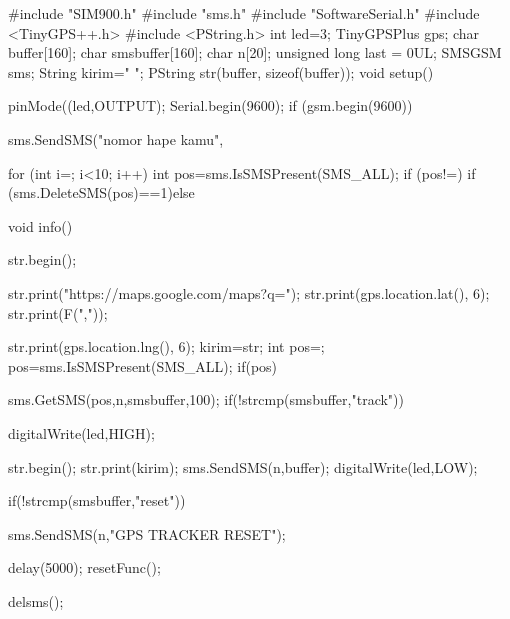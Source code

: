 #include "SIM900.h"
#include "sms.h"
#include "SoftwareSerial.h"
#include <TinyGPS++.h>
#include <PString.h>
int led=3;
TinyGPSPlus gps;
char buffer[160];
char smsbuffer[160];
char n[20];
unsigned long last = 0UL;
SMSGSM sms;
String kirim=" ";
PString str(buffer, sizeof(buffer));
void setup(){
  pinMode((led,OUTPUT);
  Serial.begin(9600);
  if (gsm.begin(9600))

  sms.SendSMS("nomor hape kamu",














for (int i=; i<10; i++)
 {  
int pos=sms.IsSMSPresent(SMS_ALL);
if (pos!=)
      {
if (sms.DeleteSMS(pos)==1){}else{}
     }
  }
}

void info(){
  str.begin();

str.print("https://maps.google.com/maps?q=");
str.print(gps.location.lat(), 6);
str.print(F(","));

str.print(gps.location.lng(), 6);
    kirim=str;
int pos=;
pos=sms.IsSMSPresent(SMS_ALL);
if(pos){

    sms.GetSMS(pos,n,smsbuffer,100);
if(!strcmp(smsbuffer,"track")){
    digitalWrite(led,HIGH);
 
 
      str.begin();
str.print(kirim);
sms.SendSMS(n,buffer);
 digitalWrite(led,LOW); 
 }
    if(!strcmp(smsbuffer,"reset")){

sms.SendSMS(n,"GPS TRACKER RESET");

 delay(5000);
resetFunc(); 
   }
    delsms();
  }
  
  
}